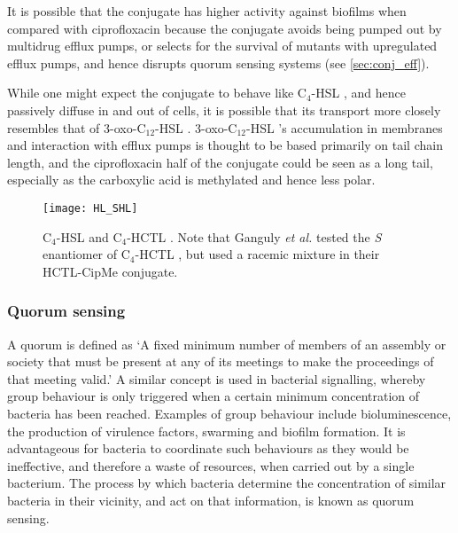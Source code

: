 It is possible that the conjugate  has higher activity against biofilms when compared with ciprofloxacin  because the conjugate  avoids being pumped out by multidrug efflux pumps, or selects for the survival of mutants with upregulated efflux pumps, and hence disrupts quorum sensing systems (see \ref{sec:conj_eff}).

While one might expect the conjugate  to behave like C$_4$-HSL , and hence passively diffuse in and out of cells, it is possible that its transport more closely resembles that of 3-oxo-C$_{12}$-HSL . 3-oxo-C$_{12}$-HSL 's accumulation in membranes and interaction with efflux pumps is thought to be based primarily on tail chain length\cite{Pearson1999}, and the ciprofloxacin half of the conjugate  could be seen as a long tail, especially as the carboxylic acid is methylated and hence less polar.

\begin{figure}[H]
	\begin{center}
		\texttt{[image: HL\_SHL]}
		\caption{
		C$_4$-HSL  and C$_4$-HCTL . Note that Ganguly \textit{et al.} tested the \textit{S} enantiomer of C$_4$-HCTL , but used a racemic mixture in their HCTL-CipMe conjugate. %
		\label{fgr:HL_SHL}}
	\end{center}
\end{figure}



\subsubsection{Quorum sensing\label{sec:QS}}

A quorum is defined as `A fixed minimum number of members of an assembly or society that must be present at any of its meetings to make the proceedings of that meeting valid.' \cite{Dictionary}  
A similar concept is used in bacterial signalling, whereby group behaviour is only triggered when a certain minimum concentration of bacteria has been reached. Examples of group behaviour include bioluminescence, the production of virulence factors, swarming and biofilm formation\cite{Miller2001}.  
It is advantageous for bacteria to coordinate such behaviours as they would be ineffective, and therefore a waste of resources, when carried out by a single bacterium.
The process by which bacteria determine the concentration of similar bacteria in their vicinity, and act on that information, is known as quorum sensing.

